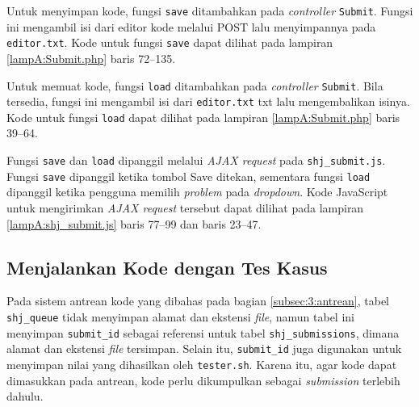 Untuk menyimpan kode, fungsi \verb|save| ditambahkan pada \textit{controller} \verb|Submit|. Fungsi ini mengambil isi dari editor kode melalui POST lalu menyimpannya pada \verb|editor.txt|. Kode untuk fungsi \verb|save| dapat dilihat pada lampiran \ref{lampA:Submit.php} baris 72--135.

Untuk memuat kode, fungsi \verb|load| ditambahkan pada \textit{controller} \verb|Submit|. Bila tersedia, fungsi ini mengambil isi dari \verb|editor.txt| txt lalu mengembalikan isinya. Kode untuk fungsi \verb|load| dapat dilihat pada lampiran \ref{lampA:Submit.php} baris 39--64.

Fungsi \verb|save| dan \verb|load| dipanggil melalui \textit{AJAX request} pada \verb|shj_submit.js|. Fungsi \verb|save| dipanggil ketika tombol Save ditekan, sementara fungsi \verb|load| dipanggil ketika pengguna memilih \textit{problem} pada \textit{dropdown}. Kode JavaScript untuk mengirimkan \textit{AJAX request} tersebut dapat dilihat pada lampiran \ref{lampA:shj_submit.js} baris 77--99 dan baris 23--47.

\subsection{Menjalankan Kode dengan Tes Kasus}
\label{sec:5:jalan}

Pada sistem antrean kode yang dibahas pada bagian \ref{subsec:3:antrean}, tabel \verb|shj_queue| tidak menyimpan alamat dan ekstensi \textit{file}, namun tabel ini menyimpan \verb|submit_id| sebagai referensi untuk tabel \verb|shj_submissions|, dimana alamat dan ekstensi \textit{file} tersimpan. Selain itu, \verb|submit_id| juga digunakan untuk menyimpan nilai yang dihasilkan oleh \verb|tester.sh|. Karena itu, agar kode dapat dimasukkan pada antrean, kode perlu dikumpulkan sebagai \textit{submission} terlebih dahulu. 

